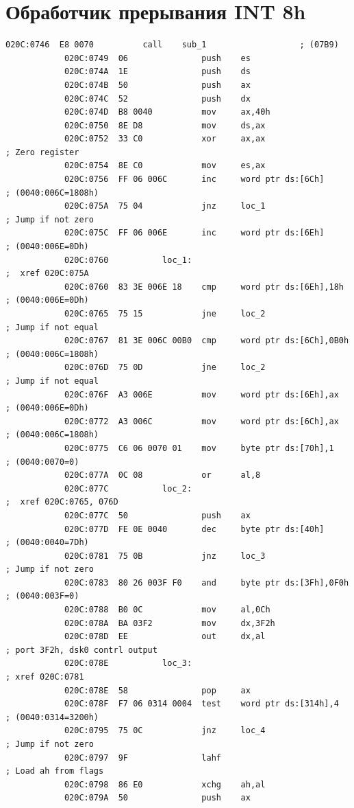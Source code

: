 \documentclass[a4paper, 12pt]{extreport}
\begin{document}
		\section{Обработчик прерывания INT 8h}
		{\linespread{1.2}
		\begin{lstlisting}[caption={Обработчик прерывания INT 8h}]
			020C:0746  E8 0070          call	sub_1                   ; (07B9)
			020C:0749  06               push	es
			020C:074A  1E               push	ds
			020C:074B  50               push	ax
			020C:074C  52               push	dx
			020C:074D  B8 0040          mov		ax,40h
			020C:0750  8E D8            mov		ds,ax
			020C:0752  33 C0            xor		ax,ax                   ; Zero register
			020C:0754  8E C0            mov		es,ax
			020C:0756  FF 06 006C       inc		word ptr ds:[6Ch]       ; (0040:006C=1808h)
			020C:075A  75 04            jnz		loc_1                   ; Jump if not zero
			020C:075C  FF 06 006E       inc		word ptr ds:[6Eh]       ; (0040:006E=0Dh)
			020C:0760			loc_1:                                      ;  xref 020C:075A
			020C:0760  83 3E 006E 18    cmp		word ptr ds:[6Eh],18h   ; (0040:006E=0Dh)
			020C:0765  75 15            jne		loc_2                   ; Jump if not equal
			020C:0767  81 3E 006C 00B0  cmp		word ptr ds:[6Ch],0B0h  ; (0040:006C=1808h)
			020C:076D  75 0D            jne		loc_2                   ; Jump if not equal
			020C:076F  A3 006E          mov		word ptr ds:[6Eh],ax    ; (0040:006E=0Dh)
			020C:0772  A3 006C          mov		word ptr ds:[6Ch],ax    ; (0040:006C=1808h)
			020C:0775  C6 06 0070 01    mov		byte ptr ds:[70h],1     ; (0040:0070=0)
			020C:077A  0C 08            or		al,8
			020C:077C			loc_2:                                      ;  xref 020C:0765, 076D
			020C:077C  50               push	ax
			020C:077D  FE 0E 0040       dec		byte ptr ds:[40h]       ; (0040:0040=7Dh)
			020C:0781  75 0B            jnz		loc_3                   ; Jump if not zero
			020C:0783  80 26 003F F0    and		byte ptr ds:[3Fh],0F0h  ; (0040:003F=0)
			020C:0788  B0 0C            mov		al,0Ch
			020C:078A  BA 03F2          mov		dx,3F2h
			020C:078D  EE               out		dx,al                   ; port 3F2h, dsk0 contrl output
			020C:078E			loc_3:                                      ; xref 020C:0781
			020C:078E  58               pop		ax
			020C:078F  F7 06 0314 0004  test	word ptr ds:[314h],4    ; (0040:0314=3200h)
			020C:0795  75 0C            jnz		loc_4                   ; Jump if not zero
			020C:0797  9F               lahf                            ; Load ah from flags
			020C:0798  86 E0            xchg	ah,al
			020C:079A  50               push	ax

\end{lstlisting}}
\end{document}

